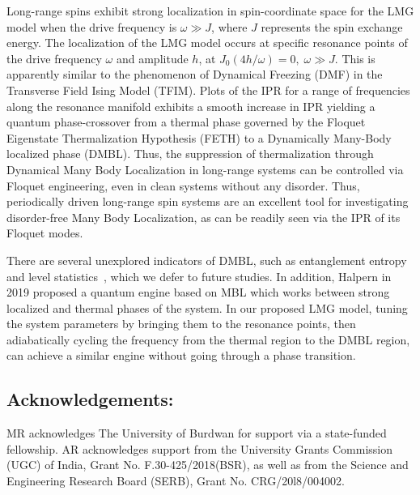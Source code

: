 \documentclass[%
reprint,
superscriptaddress,
amsmath,amssymb,
aps,
prb,
showkeys,
]{revtex4-2}
\begin{document}
	Long-range spins exhibit strong localization in spin-coordinate space for the LMG model when the drive frequency is $\omega \gg J$, where $J$ represents the spin exchange energy. The localization of the LMG model occurs at specific resonance points of the drive frequency $\omega$ and amplitude $h$, at $J_0(4h/\omega)=0,\; \omega \gg J$. This is apparently similar to the phenomenon of Dynamical Freezing (DMF) in the Transverse Field Ising Model (TFIM). Plots of the IPR for a range of frequencies along the resonance manifold exhibits a smooth increase in IPR yielding a quantum phase-crossover from a thermal phase governed by the Floquet Eigenstate Thermalization Hypothesis (FETH) to a Dynamically Many-Body localized phase (DMBL). Thus, the suppression  of thermalization through  Dynamical Many Body Localization in long-range systems can be controlled via Floquet engineering, even in clean systems without any disorder.	Thus, periodically driven long-range spin systems are an excellent tool for investigating disorder-free Many Body Localization, as can be readily seen via the IPR of its Floquet modes.
	
	There are several unexplored indicators of DMBL, such as entanglement entropy and level statistics~\cite{khemani_phase_2016}, which we defer to future studies. In addition, Halpern in 2019 proposed a quantum engine based on MBL\cite{yunger_halpern_quantum_2019} which works  between strong localized and thermal phases of the system. In our proposed LMG model, tuning the system parameters by bringing them to the resonance points, then adiabatically cycling the frequency from the thermal region to the DMBL region, can achieve a similar engine without going through a phase transition. 
	
	\subsection {Acknowledgements:}
	MR acknowledges The University of Burdwan for support via a state-funded fellowship. AR acknowledges support from the University Grants Commission (UGC) of India, Grant No. F.30-425/2018(BSR), as well as from the Science and Engineering Research Board (SERB), Grant No. CRG/20l8/004002.
	
	
	
\end{document}
